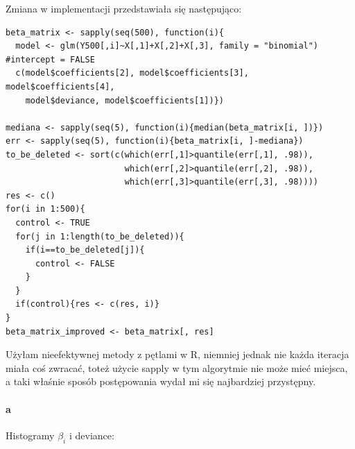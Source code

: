 \documentclass[a4paper,11pt]{article}
\begin{document}
Zmiana w implementacji przedstawiała się następująco:

\begin{verbatim}
beta_matrix <- sapply(seq(500), function(i){
  model <- glm(Y500[,i]~X[,1]+X[,2]+X[,3], family = "binomial") #intercept = FALSE
  c(model$coefficients[2], model$coefficients[3], model$coefficients[4], 
  	model$deviance, model$coefficients[1])})
  	
mediana <- sapply(seq(5), function(i){median(beta_matrix[i, ])})
err <- sapply(seq(5), function(i){beta_matrix[i, ]-mediana})
to_be_deleted <- sort(c(which(err[,1]>quantile(err[,1], .98)), 
						which(err[,2]>quantile(err[,2], .98)), 
						which(err[,3]>quantile(err[,3], .98))))
res <- c()
for(i in 1:500){
  control <- TRUE
  for(j in 1:length(to_be_deleted)){
    if(i==to_be_deleted[j]){
      control <- FALSE
    }
  }
  if(control){res <- c(res, i)}
}
beta_matrix_improved <- beta_matrix[, res]
\end{verbatim}

Użyłam nieefektywnej metody z pętlami w R, niemniej jednak nie każda iteracja miała coś zwracać, toteż użycie sapply w tym algorytmie nie może mieć miejsca, a taki właśnie sposób postępowania wydał mi się najbardziej przystępny. 

\paragraph{a} Histogramy $\beta_{i}$  i deviance:
\end{document}
